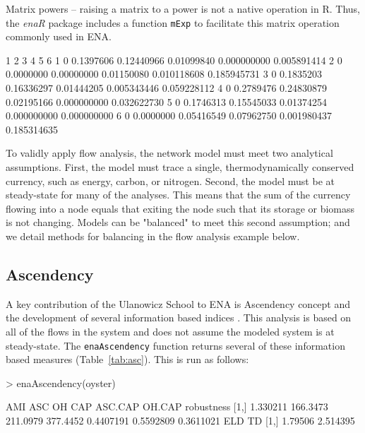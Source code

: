 \documentclass[article]{jss}
\begin{document}
Matrix powers -- raising a matrix to a power is not a native operation
in R.  Thus, the \textit{enaR} package includes a function
\texttt{mExp} to facilitate this matrix operation commonly used in ENA.

\begin{Schunk}
\begin{Soutput}
  1         2          3          4           5           6
1 0 0.1397606 0.12440966 0.01099840 0.000000000 0.005891414
2 0 0.0000000 0.00000000 0.01150080 0.010118608 0.185945731
3 0 0.1835203 0.16336297 0.01444205 0.005343446 0.059228112
4 0 0.2789476 0.24830879 0.02195166 0.000000000 0.032622730
5 0 0.1746313 0.15545033 0.01374254 0.000000000 0.000000000
6 0 0.0000000 0.05416549 0.07962750 0.001980437 0.185314635
\end{Soutput}
\end{Schunk}

To validly apply flow analysis, the network model must meet two
analytical assumptions.  First, the model must trace a single,
thermodynamically conserved currency, such as energy, carbon, or
nitrogen.  Second, the model must be at steady-state for many of the
analyses.  This means that the sum of the currency flowing into a node
equals that exiting the node such that its storage or biomass is not
changing.  Models can be "balanced" to meet this second assumption;
and we detail methods for balancing in the flow analysis example
below.


\subsection{Ascendency}

A key contribution of the Ulanowicz School to ENA is Ascendency
concept and the development of several information based indices
\citep{ulanowicz86, ulanowicz97}.  This analysis is based on all of
the flows in the system and does not assume the modeled system is at
steady-state.  The \texttt{enaAscendency} function returns several of
these information based measures (Table~\ref{tab:asc}).  This is run
as follows:

\begin{Schunk}
\begin{Sinput}
>   enaAscendency(oyster)
\end{Sinput}
\begin{Soutput}
          AMI      ASC       OH      CAP   ASC.CAP    OH.CAP robustness
[1,] 1.330211 166.3473 211.0979 377.4452 0.4407191 0.5592809  0.3611021
         ELD       TD
[1,] 1.79506 2.514395
\end{Soutput}
\end{Schunk}
\end{document}

